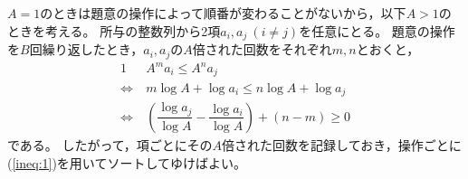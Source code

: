 \documentclass{article}
\begin{document}
$A = 1$のときは題意の操作によって順番が変わることがないから，以下$A > 1$のときを考える。
所与の整数列から2項$a_i, a_j\ (i \neq j)$を任意にとる。
題意の操作を$B$回繰り返したとき，$a_i, a_j$の$A$倍された回数をそれぞれ$m, n$とおくと，
\begin{alignat}{1}
    & A^m a_i \leq A^n a_j \\
    \Longleftrightarrow\ & m \log A + \log a_i \leq n \log A + \log a_j \\
    \Longleftrightarrow\ & \left( \dfrac{\log a_j}{\log A} - \dfrac{\log a_i}{\log A} \right) + (n - m) \geq 0 \label{ineq:1}
\end{alignat}
である。
したがって，項ごとにその$A$倍された回数を記録しておき，操作ごとに(\ref{ineq:1})を用いてソートしてゆけばよい。
\end{document}
